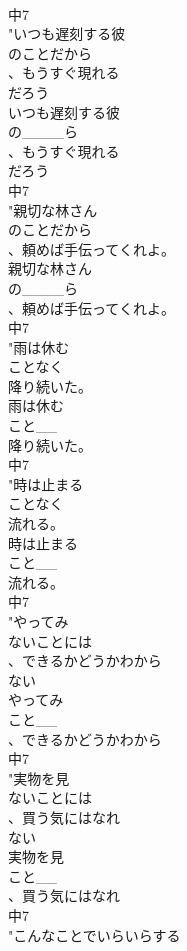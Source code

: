 \documentclass[8pt]{extreport}
\begin{document}
\begin{CJK}{UTF8}{min}
\\	中7
\\	"いつも遅刻する彼
\\	のことだから
\\	、もうすぐ現れる
\\	だろう
\\	いつも遅刻する彼
\\	の____ら
\\	、もうすぐ現れる
\\	だろう
\\	中7
\\	"親切な林さん
\\	のことだから
\\	、頼めば手伝ってくれよ。
\\	親切な林さん
\\	の____ら
\\	、頼めば手伝ってくれよ。
\\	中7
\\	"雨は休む
\\	ことなく
\\	降り続いた。
\\	雨は休む
\\	こと__
\\	降り続いた。
\\	中7
\\	"時は止まる
\\	ことなく
\\	流れる。
\\	時は止まる
\\	こと__
\\	流れる。
\\	中7
\\	"やってみ
\\	ないことには
\\	、できるかどうかわから
\\	ない
\\	やってみ
\\	こと__
\\	、できるかどうかわから
\\	中7
\\	"実物を見
\\	ないことには
\\	、買う気にはなれ
\\	ない
\\	実物を見
\\	こと__
\\	、買う気にはなれ
\\	中7
\\	"こんなことでいらいらする

\end{CJK}
\end{document}
